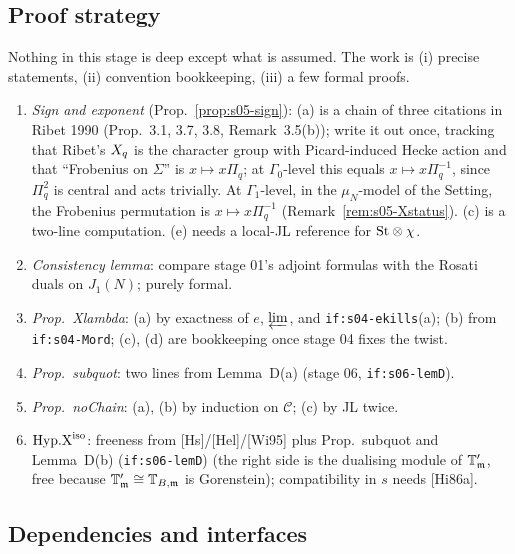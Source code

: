 \subsection{Proof strategy}
Nothing in this stage is deep except what is assumed. The work is (i) precise statements, (ii) convention bookkeeping, (iii) a
few formal proofs.
\begin{enumerate}
\item \emph{Sign and exponent} (Prop.~\ref{prop:s05-sign}): (a) is a chain of three citations in Ribet 1990 (Prop.~3.1, 3.7, 3.8,
  Remark~3.5(b)); write it out once, tracking that Ribet's $X_q$ is the character group with Picard-induced Hecke action
  and that ``Frobenius on $\Sigma$'' is $x\mapsto x\Pi_q$; at $\Gamma_0$-level this equals $x\mapsto x\Pi_q^{-1}$, since $\Pi_q^2$ is
  central and acts trivially. At $\Gamma_1$-level, in the $\mu_N$-model of the Setting, the Frobenius permutation is
  $x\mapsto x\Pi_q^{-1}$ (Remark~\ref{rem:s05-Xstatus}).
   (c) is a two-line computation. (e) needs a local-JL reference for $\mathrm{St}\otimes\chi$.
\item \emph{Consistency lemma}: compare stage 01's adjoint formulas with the Rosati duals on $J_1(N)$; purely formal.
\item \emph{Prop.~Xlambda}: (a) by exactness of $e$, $\varprojlim$, and \texttt{if:s04-ekills}(a); (b) from \texttt{if:s04-Mord}; (c),
  (d) are bookkeeping once stage 04 fixes the twist.
\item \emph{Prop.~subquot}: two lines from Lemma~D(a) (stage 06, \texttt{if:s06-lemD}).
\item \emph{Prop.~noChain}: (a), (b) by induction on $\mathcal C$; (c) by JL twice.
\item \emph{$\mathrm{Hyp.X}^{\mathrm{iso}}$}: freeness from [Hs]/[Hel]/[Wi95] plus Prop.~subquot and Lemma~D(b) (\texttt{if:s06-lemD}) (the right side is the dualising
  module of $\mathbb{T}'_{\mathfrak{m}}$, free because $\mathbb{T}'_{\mathfrak{m}}\cong\mathbb{T}_{B,\mathfrak{m}}$ is Gorenstein); compatibility in $s$ needs [Hi86a].
\end{enumerate}

\subsection{Dependencies and interfaces}
